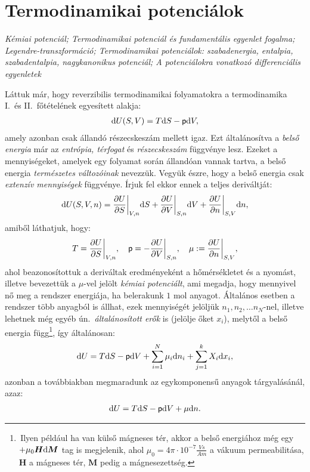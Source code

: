 \section{Termodinamikai potenciálok}
\emph{Kémiai potenciál; Termodinamikai potenciál és fundamentális egyenlet fogalma; Legendre-transzformáció; Termodinamikai potenciálok: szabadenergia, entalpia, szabadentalpia, nagykanonikus potenciál; A potenciálokra vonatkozó differenciális egyenletek}

Láttuk már, hogy reverzibilis termodinamikai folyamatokra a termodinamika I.\ és II.\ főtételének egyesített alakja:
\begin{align}
	\mathrm{d}U(S,V) = T\mathrm{d}S-\mathsf p\mathrm{d}V,
\end{align}
amely azonban csak állandó részecskeszám mellett igaz. Ezt általánosítva a \emph{belső energia} már az \emph{entrópia, térfogat} és \emph{részecskeszám} függvénye lesz. Ezeket a mennyiségeket, amelyek egy folyamat során állandóan vannak tartva, a belső energia \emph{természetes változóinak} nevezzük. Vegyük észre, hogy a belső energia csak \emph{extenzív mennyiségek} függvénye. Írjuk fel ekkor ennek a teljes deriváltját:
\begin{align}
	\mathrm{d}U(S,V,n) = \frac{\partial{U}}{\partial{S}}\bigg|_{V,n}\mathrm{d}S + \frac{\partial{U}}{\partial{V}}\bigg|_{S,n}\mathrm{d}V + \frac{\partial{U}}{\partial{n}}\bigg|_{S,V}\mathrm{d}n,
\end{align}
amiből láthatjuk, hogy:
\begin{align}
	T=\frac{\partial{U}}{\partial{S}}\bigg|_{V,n},\quad \mathsf p = -\frac{\partial{U}}{\partial{V}}\bigg|_{S,n},\quad \mu:=\frac{\partial{U}}{\partial{n}}\bigg|_{S,V},
\end{align}
ahol beazonosítottuk a deriváltak eredményeként a hőmérsékletet és a nyomást, illetve bevezettük a $\mu$-vel jelölt \emph{kémiai potenciált}, ami megadja, hogy mennyivel nő meg a rendszer energiája, ha belerakunk $1$ mol anyagot. Általános esetben a rendszer több anyagból is állhat, ezek mennyiségét jelöljük $n_1,n_2,\dots n_N$-nel, illetve lehetnek még egyéb ún.\ \emph{általánosított erők} is (jelölje őket $x_i$), melytől a belső energia függ\footnote{\,Ilyen például ha van külső mágneses tér, akkor a belső energiához még egy $+\mu_0\bm H \mathrm{d} \bm M$ tag is megjelenik, ahol $\mu_0 = 4\pi \cdot 10^{-7}\frac{Vs}{Am}$ a vákuum permeabilitása, $\bm H$ a mágneses tér, $\bm M$ pedig a mágnesezettség.}, így általánosan:
\begin{align}
	\mathrm{d}U = T\mathrm{d}S-\mathsf p \mathrm{d}V + \sum_{i=1}^N \mu_i \mathrm{d}n_i + \sum_{j=1}^k X_i \mathrm{d}x_i,
\end{align} 
azonban a továbbiakban megmaradunk az egykomponensű anyagok tárgyalásánál, azaz:
\begin{align}\label{eq:U}
	\mathrm{d}U = T\mathrm{d}S-\mathsf p \mathrm{d}V + \mu \mathrm{d}n.
\end{align}
